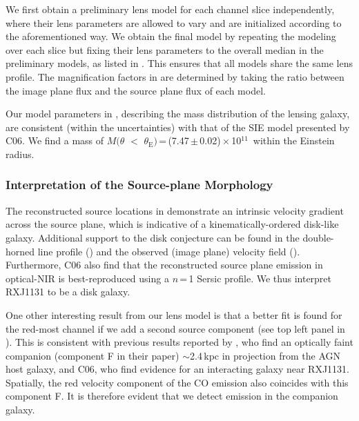\documentclass[]{emulateapj}
\begin{document}
We first obtain a preliminary lens model for each channel slice independently,
where their lens parameters are allowed to vary and are initialized according
to the aforementioned way. We obtain the final model
by repeating the modeling over each slice but fixing their lens parameters
to the overall median in the preliminary models,
as listed in .
This ensures that all models share the same lens profile.
The magnification factors in  are determined by taking the ratio
between the image plane flux and the source plane flux of each model.

Our model parameters in , describing
the mass distribution of the lensing galaxy, are consistent (within the uncertainties)
with that of the SIE model presented by C06. We find a mass of
$M(\theta$\,\,$<$\,\,$\theta_\textrm{E})$\,=\,(7.47\,$\pm$\,0.02)\,$\times$\,10$^{11}$\,\Msun
within the Einstein radius.

\subsubsection{Interpretation of the Source-plane Morphology} \label{sec:caveat}
The reconstructed source locations in  demonstrate
an intrinsic velocity gradient across the source plane, which is
indicative of a kinematically-ordered disk-like galaxy. 
Additional support to the disk conjecture
can be found in the double-horned line profile ()
and the observed (image plane) velocity field (). Furthermore,
C06 also find that the reconstructed source plane emission in optical-NIR
is best-reproduced using a $n$\,=\,1 Sersic profile.
We thus interpret RXJ1131 to be a disk galaxy.

One other interesting result from our lens model is that a better fit is
found for the red-most channel if we add a second source component (see
top left panel in ). This is consistent with previous results
reported by \citet{Brewer08a}, who find an optically faint companion
(component F in their paper) $\sim$2.4\,kpc in projection from the AGN host galaxy,
and C06, who find evidence for an interacting galaxy near RXJ1131.
Spatially, the red velocity component of the CO emission
also coincides with this component F. It is therefore evident that we
detect \bco emission in the companion galaxy.
\end{document}
